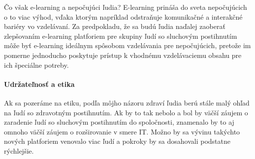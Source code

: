 \documentclass[10pt,oneside,slovak,a4paper]{article}
\begin{document}
Čo však e-learning a nepočujúci ľudia? E-learning prináša do sveta nepočujúcich o to viac výhod, vďaka ktorým napríklad odstraňuje komunikačné a interakčné bariéry vo vzdelávaní. Za predpokladu, že sa budú ľudia naďalej zaoberať zlepšovaním e-learning platforiem pre skupiny ľudí so sluchovým postihnutím môže byť e-learning ideálnym spôsobom vzdelávania pre nepočujúcich, pretože im pomerne jednoducho poskytuje prístup k vhodnému vzdelávaciemu obsahu pre ich špeciálne potreby.

\paragraph{Udržateľnosť a etika}
Ak sa pozeráme na etiku, podľa môjho názoru zdraví ľudia berú stále malý ohľad na ľudí so zdravotným postihnutím. Ak by to tak nebolo a bol by väčší záujem o zaradenie ľudí so sluchovým postihnutím do spoločnosti, znamenalo by to aj omnoho väčší záujem o rozširovanie v smere IT. Možno by sa vývinu takýchto nových platforiem venovalo viac ľudí a pokroky by sa dosahovali podstatne rýchlejšie. 



\end{document}
